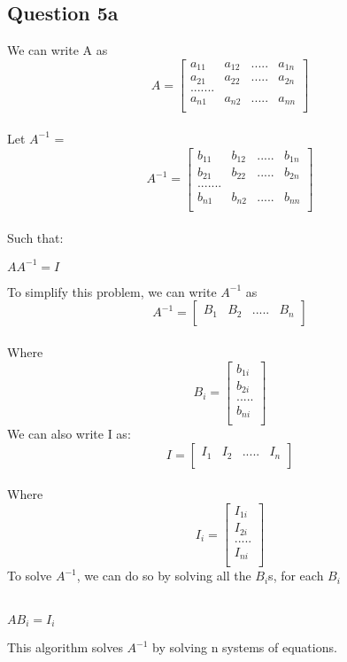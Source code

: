\documentclass[11pt]{article} %
\begin{document}
\subsection{Question 5a}
We can write A as \\ \[
A =
  \begin{bmatrix}
    a_{11} & a_{12}&.....&a_{1n} \\
    a_{21} & a_{22}&.....&a_ {2n}\\
    .......\\
    a_{n1} & a_{n2}&.....&a_{nn} \\
  \end{bmatrix}
\]\\
Let $A^{-1}$ = 
\[
A^{-1} =
  \begin{bmatrix}
    b_{11} & b_{12}&.....&b_{1n} \\
    b_{21} & b_{22}&.....&b_ {2n}\\
    .......\\
    b_{n1} & b_{n2}&.....&b_{nn} \\
  \end{bmatrix}
\]\\
Such that:\\
\centerline{$AA^{-1} = I$}\linebreak
To simplify this problem, we can write $A^{-1}$ as 
\[
A^{-1} =
  \begin{bmatrix}
    B_{1} & B_{2}&.....&B_{n} \\
  \end{bmatrix}
\]\\
Where 
\[
B_{i} =
  \begin{bmatrix}
    b_{1i}\\
    b_{2i}\\
    .....\\
    b_{ni} \\
  \end{bmatrix}
\]\linebreak
We can also write I as:
\[
I =
  \begin{bmatrix}
    I_{1} & I_{2}&.....&I_{n} \\
  \end{bmatrix}
\]\\
Where 
\[
I_{i} =
  \begin{bmatrix}
    I_{1i}\\
    I_{2i}\\
    .....\\
    I_{ni} \\
  \end{bmatrix}
\]\linebreak
To solve $A^{-1}$, we can do so by solving all the $B_{i}$s, for each $B_{i}$\\\\
\centerline{$AB_{i} = I_{i}$}\linebreak
This algorithm solves $A^{-1}$ by solving n systems of equations.\\\linebreak
\end{document}
